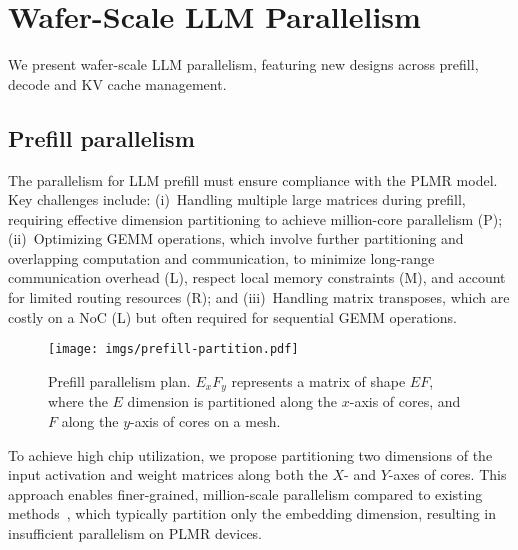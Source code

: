 
    \vspace{-3mm}
\section{Wafer-Scale LLM Parallelism}\label{sec:meshmp}
    \vspace{-1mm}
    
We present wafer-scale LLM parallelism, featuring new designs across prefill, decode and KV cache management.


    \vspace{-3mm}
\subsection{Prefill parallelism}
    \vspace{-1mm}

The parallelism for LLM prefill must ensure compliance with the PLMR model. Key challenges include: (i)~Handling multiple large matrices during prefill, requiring effective dimension partitioning to achieve million-core parallelism (P); (ii)~Optimizing GEMM operations, which involve further partitioning and overlapping computation and communication, to minimize long-range communication overhead (L), respect local memory constraints (M), and account for limited routing resources (R); and (iii)~Handling matrix transposes, which are costly on a NoC (L) but often required for sequential GEMM operations.

\begin{figure}[t!]
    \centering
    \texttt{[image: imgs/prefill-partition.pdf]}
    \vspace{-2mm}
    \caption{Prefill parallelism plan. $E_xF_y$ represents a matrix of shape $EF$, where the $E$ dimension is partitioned along the $x$-axis of cores, and $F$ along the $y$-axis of cores on a mesh.}
    \vspace{-5mm}
    \label{fig:prefill-partition}
\end{figure}

 To achieve high chip utilization, we propose partitioning two dimensions of the input activation and weight matrices along both the $X$- and $Y$-axes of cores. This approach enables finer-grained, million-scale parallelism compared to existing methods~\cite{flashattn2, flashdecoding++, megatron, google2023efficiently}, which typically partition only the embedding dimension, resulting in insufficient parallelism on PLMR devices. 

